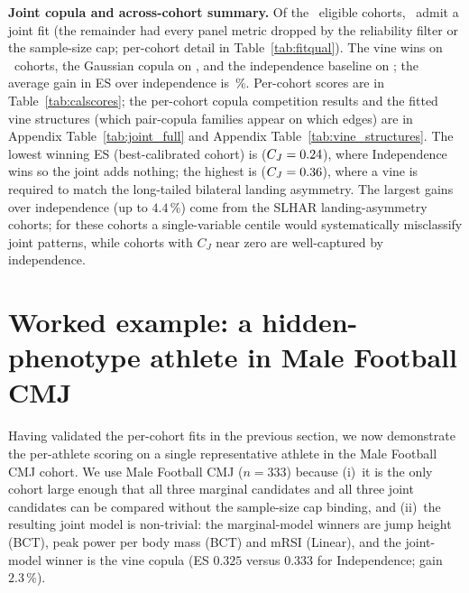 \documentclass[10pt]{article}
\begin{document}
\textbf{Joint copula and across-cohort summary.}
Of the \Ncohorts{}~eligible cohorts, \Njoint{}~admit a joint fit
(the remainder had every panel metric dropped by the reliability
filter or the sample-size cap; per-cohort detail in
Table~\ref{tab:fitqual}). The vine wins on \Nvine{}~cohorts, the
Gaussian copula on \Ngauss{}, and the independence baseline on
\Nindep{}; the average gain in ES over independence is
\MeanGain{}\,\%. Per-cohort scores are in Table~\ref{tab:calscores};
the per-cohort copula competition results and the fitted vine
structures (which pair-copula families appear on which edges) are in
Appendix Table~\ref{tab:joint_full} and Appendix
Table~\ref{tab:vine_structures}.
The lowest winning ES (best-calibrated cohort) is \BestCohort{}
($C_J = 0.24{}$), where Independence wins so the joint adds
nothing; the highest is \WorstCohort{} ($C_J = 0.36{}$), where
a vine is required to match the long-tailed bilateral landing
asymmetry. The largest gains over independence (up to $4.4\,\%$) come
from the SLHAR landing-asymmetry cohorts; for these cohorts a
single-variable centile would systematically misclassify joint
patterns, while cohorts with $C_J$ near zero are well-captured by
independence.

\begin{table}[!htbp]
\centering
\scriptsize
\caption{Per-cohort calibration scores. $C_M$~$=$~mean best-marginal
CRPS$/$IQR (lower is sharper); $C_J$~$=$~winning joint ES (lower is
better). Worked-example cohort in \textbf{bold}.}
\label{tab:calscores}

\end{table}

\FloatBarrier
\section{Worked example: a hidden-phenotype athlete in Male Football CMJ}
\label{sec:example}

Having validated the per-cohort fits in the previous section, we now
demonstrate the per-athlete scoring on a single representative athlete
in the Male Football CMJ cohort. We use Male Football CMJ ($n = 333$)
because (i)~it is the only cohort large enough that all three
marginal candidates and all three joint candidates can be compared
without the sample-size cap binding, and (ii)~the resulting joint
model is non-trivial: the marginal-model winners are jump height
(BCT), peak power per body mass (BCT) and mRSI (Linear), and the
joint-model winner is the vine copula (ES $0.325$ versus $0.333$ for
Independence; gain $2.3\,\%$).
\end{document}
